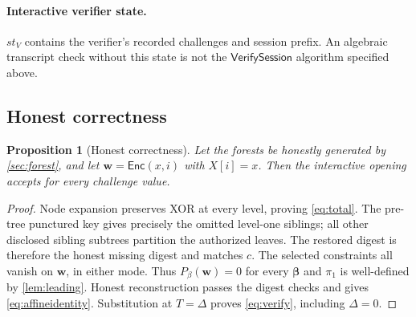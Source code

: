 \documentclass[11pt]{article}
\theoremstyle{plain}
\newtheorem{proposition}[theorem]{Proposition}
\theoremstyle{definition}
\theoremstyle{remark}
\newcommand{\Enc}{\mathsf{Enc}}
\begin{document}
\paragraph{Interactive verifier state.}
$st_V$ contains the verifier's recorded challenges and session prefix.
An algebraic transcript check without this state is not the
$\mathsf{VerifySession}$ algorithm specified above.

\subsection{Honest correctness}
\begin{proposition}[Honest correctness]
Let the forests be honestly generated by \cref{sec:forest}, and let
$\mathbf w=\Enc(x,i)$ with $X[i]=x$.
Then the interactive opening accepts for every challenge value.
\end{proposition}
\begin{proof}
Node expansion preserves XOR at every level, proving \cref{eq:total}.
The pre-tree punctured key gives precisely the omitted level-one siblings;
all other disclosed sibling subtrees partition the authorized leaves.
The restored digest is therefore the honest missing digest and matches $c$.
The selected constraints all vanish on $\mathbf w$, in either mode.
Thus $P_\beta(\mathbf w)=0$ for every $\boldsymbol\beta$ and
$\pi_1$ is well-defined by \cref{lem:leading}.
Honest reconstruction passes the digest checks and gives
\cref{eq:affineidentity}. Substitution at $T=\Delta$ proves
\cref{eq:verify}, including $\Delta=0$.
\end{proof}

\printbibliography
\end{document}
